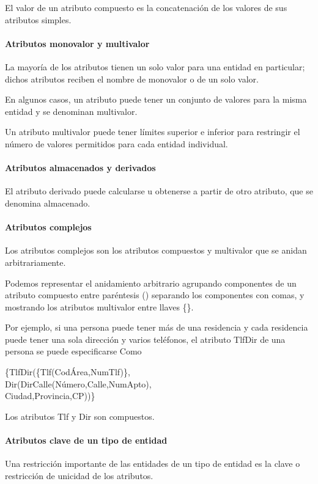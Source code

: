 El valor de un atributo compuesto es la concatenación de los valores de sus atributos simples.

\paragraph*{Atributos monovalor y multivalor}  La mayoría de los atributos tienen un solo valor para una entidad en particular; dichos atributos reciben el nombre de monovalor o de un solo valor. 


En algunos casos, un atributo puede tener un conjunto de valores para la misma entidad y se denominan multivalor.


Un atributo multivalor puede tener límites superior e inferior para restringir el número de valores permitidos para cada entidad individual.


\paragraph*{Atributos almacenados y derivados}
El atributo derivado puede calcularse u obtenerse a partir de otro atributo, que se denomina almacenado.


\paragraph*{Atributos complejos}

Los atributos complejos son los atributos compuestos y multivalor que se anidan arbitrariamente.

Podemos representar el anidamiento arbitrario agrupando componentes de un atributo compuesto entre paréntesis () separando los componentes con comas, y mostrando los atributos multivalor entre llaves \{\}. 

Por ejemplo, si una persona puede tener más de una residencia y cada
residencia puede tener una sola dirección y varios teléfonos, el atributo TlfDir de una persona se puede especificarse Como


\{TlfDir(\{Tlf(CodÁrea,NumTlf)\},\\
Dir(DirCalle(Número,Calle,NumApto),\\
Ciudad,Provincia,CP))\}

Los atributos Tlf y Dir son compuestos.
\paragraph*{Atributos clave de un tipo de entidad}
Una restricción importante de las entidades de un tipo de entidad es la clave o restricción de unicidad de los atributos.


